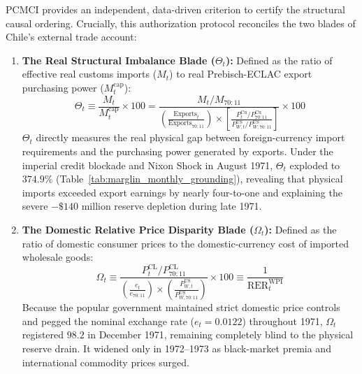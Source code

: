 PCMCI provides an independent, data-driven criterion to certify the structural causal ordering. Crucially, this authorization protocol reconciles the two blades of Chile's external trade account:
\begin{enumerate}[leftmargin=2em]
	\item \textbf{The Real Structural Imbalance Blade ($\Theta_t$):} Defined as the ratio of effective real customs imports ($M_t$) to real Prebisch-ECLAC export purchasing power ($M^{\text{cap}}_t$):
	\begin{equation}
		\Theta_t \equiv \frac{M_t}{M^{\text{cap}}_t} \times 100 = \frac{M_t / M_{70:11}}{\left( \frac{\text{Exports}_t}{\text{Exports}_{70:11}} \right) \times \left[ \frac{P^{\text{Cu}}_t / P^{\text{Cu}}_{70:11}}{P^{\text{US}}_{W,t} / P^{\text{US}}_{W,70:11}} \right]} \times 100
		\label{eq:app_h_theta}
	\end{equation}
	$\Theta_t$ directly measures the real physical gap between foreign-currency import requirements and the purchasing power generated by exports. Under the imperial credit blockade and Nixon Shock in August 1971, $\Theta_t$ exploded to $374.9\%$ (Table~\ref{tab:marglin_monthly_grounding}), revealing that physical imports exceeded export earnings by nearly four-to-one and explaining the severe $-\$140$ million reserve depletion during late 1971.
	\item \textbf{The Domestic Relative Price Disparity Blade ($\Omega_t$):} Defined as the ratio of domestic consumer prices to the domestic-currency cost of imported wholesale goods:
	\begin{equation}
		\Omega_t \equiv \frac{P^{\text{CL}}_t / P^{\text{CL}}_{70:11}}{\left( \frac{e_t}{e_{70:11}} \right) \times \left( \frac{P^{\text{US}}_{W,t}}{P^{\text{US}}_{W,70:11}} \right)} \times 100 \equiv \frac{1}{\text{RER}^{\text{WPI}}_t}
		\label{eq:app_h_omega}
	\end{equation}
	Because the popular government maintained strict domestic price controls and pegged the nominal exchange rate ($e_t = 0.0122$) throughout 1971, $\Omega_t$ registered $98.2$ in December 1971, remaining completely blind to the physical reserve drain. It widened only in 1972--1973 as black-market premia and international commodity prices surged.
\end{enumerate}

